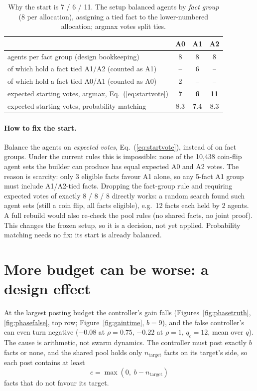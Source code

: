 \documentclass[10pt,a4paper]{article}
\begin{document}
\begin{table}[H]
\centering\small
\caption{Why the start is 7 / 6 / 11. The setup balanced agents by \emph{fact group}
(8 per allocation), assigning a tied fact to the lower-numbered allocation; argmax votes
split ties.}
\label{tab:start}
\begin{tabular}{lccc}
\toprule
 & A0 & A1 & A2 \\
\midrule
agents per fact group (design bookkeeping) & 8 & 8 & 8 \\
\quad of which hold a fact tied A1/A2 (counted as A1) & -- & 6 & -- \\
\quad of which hold a fact tied A0/A1 (counted as A0) & 2 & -- & -- \\
expected starting votes, argmax, Eq.~(\ref{eq:startvote}) & \textbf{7} & \textbf{6} & \textbf{11} \\
expected starting votes, probability matching & 8.3 & 7.4 & 8.3 \\
\bottomrule
\end{tabular}
\end{table}

\paragraph{How to fix the start.} Balance the agents on \emph{expected votes},
Eq.~(\ref{eq:startvote}), instead of on fact groups. Under the current rules this is
impossible: none of the 10,438 coin-flip agent sets the builder can produce has equal
expected A0 and A2 votes. The reason is scarcity: only 3 eligible facts favour A1
alone, so any 5-fact A1 group must include A1/A2-tied facts. Dropping the
fact-group rule and requiring expected votes of exactly 8 / 8 / 8 directly works: a
random search found such agent sets (still a coin flip, all facts eligible), e.g.\ 12
facts each held by 2 agents. A full rebuild would also re-check the pool rules (no
shared facts, no joint proof). This changes the frozen setup, so it is a decision, not
yet applied. Probability matching needs no fix: its start is already balanced.

\section{More budget can be worse: a design effect}\label{sec:budget}

At the largest posting budget the controller's gain falls (Figures~\ref{fig:phasetruth},
\ref{fig:phasefalse}, top row; Figure~\ref{fig:gaintime}, $b = 9$), and the false
controller's can even turn negative ($-0.08$ at $\rho = 0.75$, $-0.22$ at $\rho = 1$,
$q_c = 12$, mean over $q$). The cause is arithmetic, not swarm dynamics. The controller
must post exactly $b$ facts or none, and the shared pool holds only $n_{\text{target}}$
facts on its target's side, so each post contains at least
\begin{equation}\label{eq:counter}
c = \max(0,\; b - n_{\text{target}})
\end{equation}
facts that do not favour its target.
\end{document}
